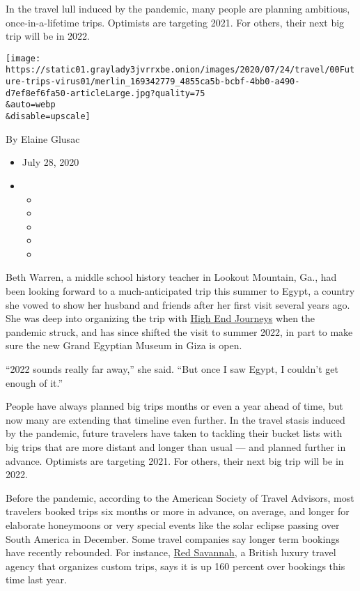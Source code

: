 In the travel lull induced by the pandemic, many people are planning
ambitious, once-in-a-lifetime trips. Optimists are targeting 2021. For
others, their next big trip will be in 2022.

\texttt{[image: https://static01.graylady3jvrrxbe.onion/images/2020/07/24/travel/00Future-trips-virus01/merlin\_169342779\_4855ca5b-bcbf-4bb0-a490-d7ef8ef6fa50-articleLarge.jpg?quality=75\\\&auto=webp\\\&disable=upscale]}

By Elaine Glusac

\begin{itemize}
\item
  July 28, 2020
\item
  \begin{itemize}
  \item
  \item
  \item
  \item
  \item
  \end{itemize}
\end{itemize}

Beth Warren, a middle school history teacher in Lookout Mountain, Ga.,
had been looking forward to a much-anticipated trip this summer to
Egypt, a country she vowed to show her husband and friends after her
first visit several years ago. She was deep into organizing the trip
with \href{https://www.highendjourneys.com/}{High End Journeys} when the
pandemic struck, and has since shifted the visit to summer 2022, in part
to make sure the new Grand Egyptian Museum in Giza is open.

``2022 sounds really far away,'' she said. ``But once I saw Egypt, I
couldn't get enough of it.''

People have always planned big trips months or even a year ahead of
time, but now many are extending that timeline even further. In the
travel stasis induced by the pandemic, future travelers have taken to
tackling their bucket lists with big trips that are more distant and
longer than usual --- and planned further in advance. Optimists are
targeting 2021. For others, their next big trip will be in 2022.

Before the pandemic, according to the American Society of Travel
Advisors, most travelers booked trips six months or more in advance, on
average, and longer for elaborate honeymoons or very special events like
the solar eclipse passing over South America in December. Some travel
companies say longer term bookings have recently rebounded. For
instance, \href{https://www.redsavannah.com/}{Red Savannah}, a British
luxury travel agency that organizes custom trips, says it is up 160
percent over bookings this time last year.

